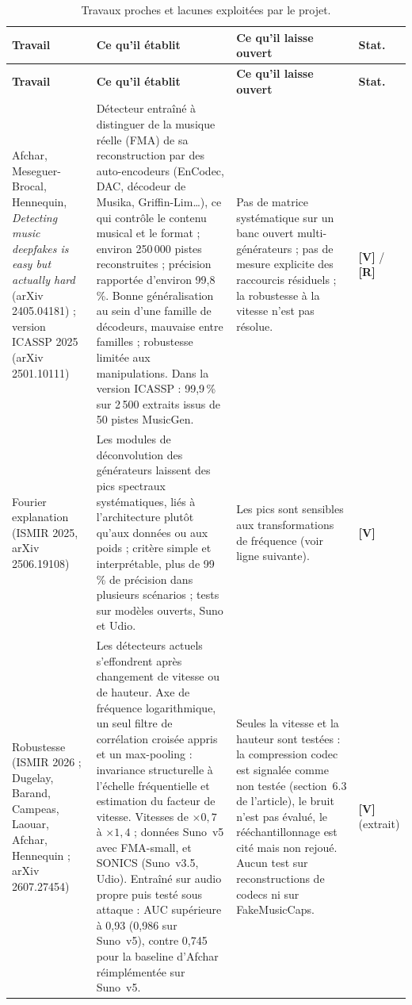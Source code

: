 \documentclass[11pt,a4paper]{article}
\newcommand{\sV}{\textbf{[V]}}
\newcommand{\sR}{\textbf{[R]}}
\begin{document}
{\small
\begin{longtable}{L{2.9cm}L{5.7cm}L{5.0cm}L{0.9cm}}
\caption{Travaux proches et lacunes exploitées par le projet.}\label{tab:etatart}\\
\toprule
\textbf{Travail} & \textbf{Ce qu'il établit} & \textbf{Ce qu'il laisse ouvert} & \textbf{Stat.}\\
\midrule
\endfirsthead
\toprule
\textbf{Travail} & \textbf{Ce qu'il établit} & \textbf{Ce qu'il laisse ouvert} & \textbf{Stat.}\\
\midrule
\endhead
\bottomrule
\endfoot
Afchar, Meseguer-Brocal, Hennequin, \emph{Detecting music deepfakes is easy but actually hard} (arXiv 2405.04181) ; version ICASSP 2025 (arXiv 2501.10111) &
Détecteur entraîné à distinguer de la musique réelle (FMA) de sa reconstruction par des auto-encodeurs (EnCodec, DAC, décodeur de Musika, Griffin-Lim\ldots), ce qui contrôle le contenu musical et le format ; environ 250\,000 pistes reconstruites ; précision rapportée d'environ 99,8\,\%. Bonne généralisation au sein d'une famille de décodeurs, mauvaise entre familles ; robustesse limitée aux manipulations. Dans la version ICASSP : 99,9\,\% sur 2\,500 extraits issus de 50 pistes MusicGen. &
Pas de matrice systématique sur un banc ouvert multi-générateurs ; pas de mesure explicite des raccourcis résiduels ; la robustesse à la vitesse n'est pas résolue. & \sV{} / \sR\\
Fourier explanation (ISMIR 2025, arXiv 2506.19108) &
Les modules de déconvolution des générateurs laissent des pics spectraux systématiques, liés à l'architecture plutôt qu'aux données ou aux poids ; critère simple et interprétable, plus de 99\,\% de précision dans plusieurs scénarios ; tests sur modèles ouverts, Suno et Udio. &
Les pics sont sensibles aux transformations de fréquence (voir ligne suivante). & \sV\\
Robustesse (ISMIR 2026 ; Dugelay, Barand, Campeas, Laouar, Afchar, Hennequin ; arXiv 2607.27454) &
Les détecteurs actuels s'effondrent après changement de vitesse ou de hauteur. Axe de fréquence logarithmique, un seul filtre de corrélation croisée appris et un max-pooling : invariance structurelle à l'échelle fréquentielle et estimation du facteur de vitesse. Vitesses de $\times 0{,}7$ à $\times 1{,}4$ ; données Suno~v5 avec FMA-small, et SONICS (Suno~v3.5, Udio). Entraîné sur audio propre puis testé sous attaque : AUC supérieure à 0,93 (0,986 sur Suno~v5), contre 0,745 pour la baseline d'Afchar réimplémentée sur Suno~v5. &
Seules la vitesse et la hauteur sont testées : la compression codec est signalée comme non testée (section~6.3 de l'article), le bruit n'est pas évalué, le rééchantillonnage est cité mais non rejoué. Aucun test sur reconstructions de codecs ni sur FakeMusicCaps. & \sV{} (extrait)\\

\end{longtable}}
\end{document}

